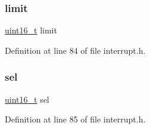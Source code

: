 \mbox{\label{a00110_ab28e82ae69032cb4ad3ec3a0be3d7129_ab28e82ae69032cb4ad3ec3a0be3d7129}} 
\subsubsection{\texorpdfstring{limit}{limit}}
{\footnotesize\ttfamily \hyperlink{a00140_a273cf69d639a59973b6019625df33e30_a273cf69d639a59973b6019625df33e30}{uint16\+\_\+t} limit}



Definition at line 84 of file interrupt.\+h.

\mbox{\label{a00110_af0b0a7e10694e3b600c7561311cc8271_af0b0a7e10694e3b600c7561311cc8271}} 
\subsubsection{\texorpdfstring{sel}{sel}}
{\footnotesize\ttfamily \hyperlink{a00140_a273cf69d639a59973b6019625df33e30_a273cf69d639a59973b6019625df33e30}{uint16\+\_\+t} sel}



Definition at line 85 of file interrupt.\+h.

